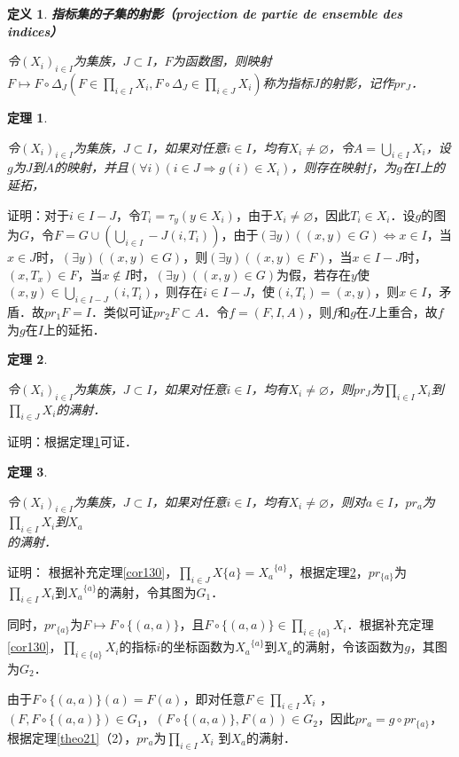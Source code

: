 \documentclass[12pt, a4paper, oneside]{book}
\newtheorem{theo}{定理}
\newtheorem{de}{定义}
\begin{document}
			\begin{de}
				\textbf{指标集的子集的射影（projection de partie de ensemble des indices）}
				\par
				令$(X_i)_{i\in I}$为集族，$J\subset I$，$F$为函数图，则映射$F\mapsto F\circ \Delta_J(F\in \prod\limits_{i\in I}X_i , F\circ \Delta_J\in \prod\limits_{i\in J}X_i)$称为指标$J$的射影，记作$pr_J$．
			\end{de}
			
			\begin{theo}\label{theo41}
				\hfill\par
				令$(X_i)_{i\in I}$为集族，$J\subset I$，如果对任意$i\in I$，均有$X_i\neq \varnothing$，令$A=\bigcup\limits_{i\in I}X_i$，设$g$为$J$到$A$的映射，并且$(\forall i)(i\in J\Rightarrow g(i)\in X_i)$，则存在映射$f$，为$g$在$I$上的延拓，
			\end{theo}
			证明：对于$i\in I-J$，令$T_i=\tau_y(y\in X_i)$，由于$X_i\neq \varnothing$，因此$T_i\in X_i$．设$g$的图为$G$，令$F=G\cup(\bigcup\limits_{i\in I}-J(i, T_i))$，由于$(\exists y)((x, y)\in G)\Leftrightarrow x\in I$，当$x\in J$时，$(\exists y)((x, y)\in G)$，则$(\exists y)((x, y)\in F)$，当$x\in I-J$时，$(x, T_x)\in F$，当$x\notin I$时，$(\exists y)((x, y)\in G)$为假，若存在$y$使$(x, y)\in \bigcup\limits_{i\in I-J}(i, T_i)$，则存在$i\in I-J$，使$(i, T_i)=(x, y)$，则$x\in I$，矛盾．故$pr_1F=I$．类似可证$pr_2F\subset A$．令$f=(F, I, A)$，则$f$和$g$在$J$上重合，故$f$为$g$在$I$上的延拓．
						
			\begin{theo}\label{theo42}
				\hfill\par
				令$(X_i)_{i\in I}$为集族，$J\subset I$，如果对任意$i\in I$，均有$X_i\neq \varnothing$，则$pr_J$为$\prod\limits_{i\in I}X_i$到$\prod\limits_{i\in J}X_i$的满射．
			\end{theo}
			证明：根据定理\ref{theo41}可证．
			
			\begin{theo}\label{theo43}
				\hfill\par
				令$(X_i)_{i\in I}$为集族，$J\subset I$，如果对任意$i\in I$，均有$X_i\neq \varnothing$，则对$a\in I$，$pr_a$为$\prod\limits_{i\in I}X_i$到$X_a$\\的满射．
			\end{theo}
			证明：
			根据补充定理\ref{cor130}，$\prod\limits_{i\in J}X\{a\}={X_a}^{\{a\}}$，根据定理\ref{theo42}，$pr_{\{a\}}$为$\prod\limits_{i\in I}X_i $到${X_a}^{\{a\}}$的满射，令其图为$G_1$．
			\par
			同时，$pr_{\{a\}}$为$F\mapsto F\circ \{(a, a)\}$，且$F\circ \{(a, a)\}\in \prod\limits_{i\in \{a\}}X_i$．根据补充定理\ref{cor130}，$\prod\limits_{i\in \{a\}}X_i$的指标$i$的坐标函数为${X_a}^{\{a\}}$到$X_a$的满射，令该函数为$g$，其图为$G_2$．
			\par
			由于$F\circ \{(a, a)\}(a)=F(a)$，即对任意$F\in \prod\limits_{i\in I}X_i$ ，$(F, F\circ \{(a, a)\})\in G_1$，$(F\circ \{(a, a)\}, F(a))\in G_2$，因此$pr_a=g\circ pr_{\{a\}}$，根据定理\ref{theo21}（2），$pr_a$为$\prod\limits_{i\in I}X_i$ 到$X_a$的满射．
						
\end{document}
